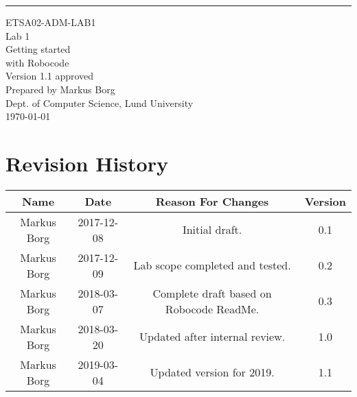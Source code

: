 \documentclass{scrreprt}
\date{}
\def\myversion{1.1 }
\begin{document}
\begin{flushright}
    \rule{16cm}{5pt}\vskip1cm
    \begin{bfseries}
    	\LARGE{ETSA02-ADM-LAB1}\\
    	\vspace{1.5cm}
        \Huge{Lab 1}\\
        \vspace{0.5cm}
        Getting started\\
        \vspace{0.5cm}
        with Robocode\\
        \vspace{1.5cm}
        \LARGE{Version \myversion approved}\\
        \vspace{1.5cm}
        Prepared by Markus Borg\\
        Dept. of Computer Science, Lund University\\
        \vspace{1.5cm}
        \today\\
    \end{bfseries}
\end{flushright}


\chapter*{Revision History}

\begin{center}
    \begin{tabular}{|c|c|c|c|}
        \hline
	    Name & Date & Reason For Changes & Version\\
        \hline
	    Markus Borg & 2017-12-08 & Initial draft. & 0.1\\
        \hline
        Markus Borg & 2017-12-09 & Lab scope completed and tested. & 0.2\\
        \hline
        Markus Borg & 2018-03-07 & Complete draft based on Robocode ReadMe. & 0.3\\
        \hline
        Markus Borg & 2018-03-20 & Updated after internal review. & 1.0\\
        \hline
        Markus Borg & 2019-03-04 & Updated version for 2019. & 1.1\\
        \hline
    \end{tabular}
\end{center}
\end{document}
